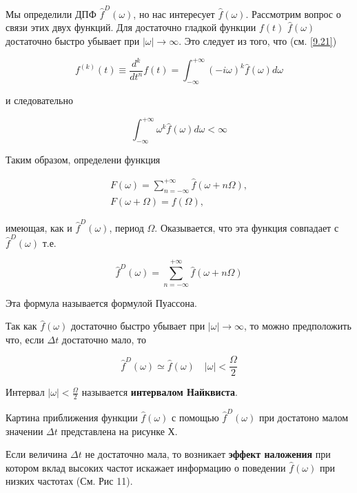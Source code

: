 Мы определили ДПФ $\hat{f}^D(\omega)$, но нас интересует $\hat{f}(\omega)$. Рассмотрим вопрос о связи этих двух функций. Для достаточно гладкой функции $f(t)$  $\hat{f}(\omega)$ достаточно быстро убывает при $|\omega| \rightarrow \infty $. Это следует из того, что (см. \ref{9.21})

\begin{equation}\label{10.16}
f^{(k)}(t) \equiv \frac{d^k}{dt^n}f(t) = \int_{-\infty}^{+\infty} (-i\omega)^k \hat{f}(\omega)d\omega
\end{equation}

и следовательно

\begin{equation}\label{10.17}
\int_{-\infty}^{+\infty}\omega^k \hat{f}(\omega)d\omega < \infty
\end{equation}

Таким образом, определени функция

\begin{equation}\label{10.18}
\begin{gathered}
F(\omega) = \sum_{n = -\infty}^{+\infty} \hat{f}(\omega+ n\Omega), \\
F(\omega+\Omega) = f(\Omega),
\end{gathered}
\end{equation}

имеющая, как и $\hat{f}^D(\omega)$, период $\Omega$. 
Оказывается, что эта функция совпадает с $\hat{f}^D(\omega)$ т.е.

\begin{equation}\label{10.19}
\hat{f}^D(\omega) = \sum_{n = -\infty}^{+\infty} \hat{f}(\omega+ n\Omega)
\end{equation}

Эта формула называется формулой Пуассона.

Так как $\hat{f}(\omega)$ достаточно быстро убывает при $|\omega| \rightarrow \infty $, то можно предположить что, если $\Delta t$ достаточно мало, то

\begin{equation}\label{10.20}
\hat{f}^D(\omega) \simeq \hat{f}(\omega) \quad |\omega| < \frac{\Omega}{2}
\end{equation}

Интервал $|\omega| < \frac{\Omega}{2}$ называется \textbf{интервалом Найквиста}.

Картина приближения функции $\hat{f}(\omega)$ с помощью $\hat{f}^D(\omega)$ при достатоно малом значении $\Delta t$ представлена на рисунке Х.

Если величина $\Delta t$ не достаточно мала, то возникает \textbf{эффект наложения} при котором вклад высоких частот искажает информацию о поведении $\hat{f}(\omega)$ при низких частотах (См. Рис 11).

